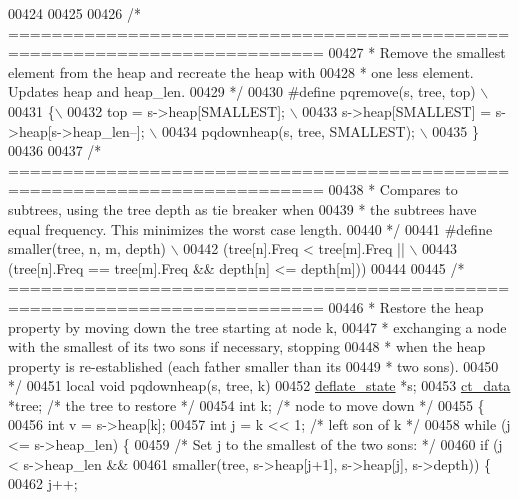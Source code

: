 \begin{DoxyCode}
{{{{{{{{{00424 
00425 
00426 \textcolor{comment}{/* ===========================================================================}
00427 \textcolor{comment}{ * Remove the smallest element from the heap and recreate the heap with}
00428 \textcolor{comment}{ * one less element. Updates heap and heap\_len.}
00429 \textcolor{comment}{ */}
00430 \textcolor{preprocessor}{#define pqremove(s, tree, top) \(\backslash\)}
00431 \textcolor{preprocessor}{\{\(\backslash\)}
00432 \textcolor{preprocessor}{    top = s->heap[SMALLEST]; \(\backslash\)}
00433 \textcolor{preprocessor}{    s->heap[SMALLEST] = s->heap[s->heap\_len--]; \(\backslash\)}
00434 \textcolor{preprocessor}{    pqdownheap(s, tree, SMALLEST); \(\backslash\)}
00435 \textcolor{preprocessor}{\}}
00436 
00437 \textcolor{comment}{/* ===========================================================================}
00438 \textcolor{comment}{ * Compares to subtrees, using the tree depth as tie breaker when}
00439 \textcolor{comment}{ * the subtrees have equal frequency. This minimizes the worst case length.}
00440 \textcolor{comment}{ */}
00441 \textcolor{preprocessor}{#define smaller(tree, n, m, depth) \(\backslash\)}
00442 \textcolor{preprocessor}{   (tree[n].Freq < tree[m].Freq || \(\backslash\)}
00443 \textcolor{preprocessor}{   (tree[n].Freq == tree[m].Freq && depth[n] <= depth[m]))}
00444 
00445 \textcolor{comment}{/* ===========================================================================}
00446 \textcolor{comment}{ * Restore the heap property by moving down the tree starting at node k,}
00447 \textcolor{comment}{ * exchanging a node with the smallest of its two sons if necessary, stopping}
00448 \textcolor{comment}{ * when the heap property is re-established (each father smaller than its}
00449 \textcolor{comment}{ * two sons).}
00450 \textcolor{comment}{ */}
00451 local \textcolor{keywordtype}{void} pqdownheap(s, tree, k)
00452     \hyperlink{structinternal__state}{deflate\_state} *s;
00453     \hyperlink{structct__data__s}{ct\_data} *tree;  \textcolor{comment}{/* the tree to restore */}
00454     \textcolor{keywordtype}{int} k;               \textcolor{comment}{/* node to move down */}
00455 \{
00456     \textcolor{keywordtype}{int} v = s->heap[k];
00457     \textcolor{keywordtype}{int} j = k << 1;  \textcolor{comment}{/* left son of k */}
00458     \textcolor{keywordflow}{while} (j <= s->heap\_len) \{
00459         \textcolor{comment}{/* Set j to the smallest of the two sons: */}
00460         \textcolor{keywordflow}{if} (j < s->heap\_len &&
00461             smaller(tree, s->heap[j+1], s->heap[j], s->depth)) \{
00462             j++;
}}}}}}}}}
\end{DoxyCode}
